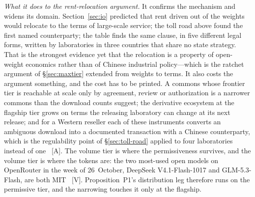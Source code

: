 \emph{What it does to the rent-relocation argument.} It confirms the mechanism and widens its domain. Section~\ref{sec:io} predicted that rent driven out of the weights would relocate to the terms of large-scale service; the toll road above found the first named counterparty; the table finds the same clause, in five different legal forms, written by laboratories in three countries that share no state strategy. That is the strongest evidence yet that the relocation is a property of open-weight economics rather than of Chinese industrial policy---which is the ratchet argument of \S\ref{sec:maxtier} extended from weights to terms. It also costs the argument something, and the cost has to be printed. A commons whose frontier tier is reachable at scale only by agreement, review or authorization is a narrower commons than the download counts suggest; the derivative ecosystem at the flagship tier grows on terms the releasing laboratory can change at its next release; and for a Western reseller each of these instruments converts an ambiguous download into a documented transaction with a Chinese counterparty, which is the regulability point of \S\ref{sec:toll-road} applied to four laboratories instead of one~\cite{webster-regulability} [A]. The volume tier is where the permissiveness survives, and the volume tier is where the tokens are: the two most-used open models on OpenRouter in the week of 26~October, DeepSeek V4.1-Flash-1017 and GLM-5.3-Flash, are both MIT~\cite{mdl-openrouter-oct26} [V]. Proposition~P1's distribution leg therefore runs on the permissive tier, and the narrowing touches it only at the flagship.


